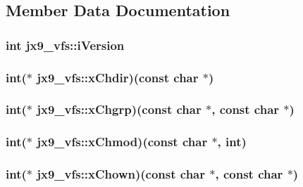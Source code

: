\subsection{Member Data Documentation}
\hypertarget{structjx9__vfs_a2eee63a849ff3f77c2a903e613c003b6}{
\subsubsection[{i\-Version}]{\setlength{\rightskip}{0pt plus 5cm}int jx9\-\_\-vfs\-::i\-Version}}\label{da/d75/structjx9__vfs_a2eee63a849ff3f77c2a903e613c003b6}
\hypertarget{structjx9__vfs_ab044f9cb336dbc8d93b10f9738cbf8fa}{
\subsubsection[{x\-Chdir}]{\setlength{\rightskip}{0pt plus 5cm}int($\ast$ jx9\-\_\-vfs\-::x\-Chdir)(const char $\ast$)}}\label{da/d75/structjx9__vfs_ab044f9cb336dbc8d93b10f9738cbf8fa}
\hypertarget{structjx9__vfs_a6d57d3d1c0a323343e7f98e4d575bfdd}{
\subsubsection[{x\-Chgrp}]{\setlength{\rightskip}{0pt plus 5cm}int($\ast$ jx9\-\_\-vfs\-::x\-Chgrp)(const char $\ast$, const char $\ast$)}}\label{da/d75/structjx9__vfs_a6d57d3d1c0a323343e7f98e4d575bfdd}
\hypertarget{structjx9__vfs_aa1031c19632a860cf258bb719c6e1b0f}{
\subsubsection[{x\-Chmod}]{\setlength{\rightskip}{0pt plus 5cm}int($\ast$ jx9\-\_\-vfs\-::x\-Chmod)(const char $\ast$, int)}}\label{da/d75/structjx9__vfs_aa1031c19632a860cf258bb719c6e1b0f}
\hypertarget{structjx9__vfs_ac9eba64687b2dd2411dd2c6e2e1c1e1f}{
\subsubsection[{x\-Chown}]{\setlength{\rightskip}{0pt plus 5cm}int($\ast$ jx9\-\_\-vfs\-::x\-Chown)(const char $\ast$, const char $\ast$)}}\label{da/d75/structjx9__vfs_ac9eba64687b2dd2411dd2c6e2e1c1e1f}
